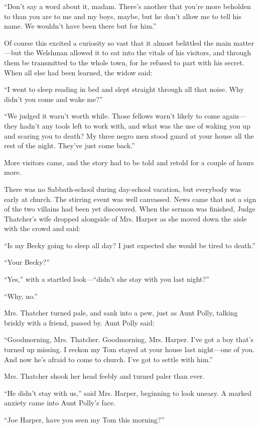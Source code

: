 \documentclass{book}
\begin{document}
“Don’t say a word about it, madam. There’s another that you’re more beholden to than you are to me and my boys, maybe, but he don’t allow me to tell his name. We wouldn’t have been there but for him.”

Of course this excited a curiosity so vast that it almost belittled the main matter—but the Welshman allowed it to eat into the vitals of his visitors, and through them be transmitted to the whole town, for he refused to part with his secret. When all else had been learned, the widow said:

“I went to sleep reading in bed and slept straight through all that noise. Why didn’t you come and wake me?”

“We judged it warn’t worth while. Those fellows warn’t likely to come again—they hadn’t any tools left to work with, and what was the use of waking you up and scaring you to death? My three negro men stood guard at your house all the rest of the night. They’ve just come back.”

More visitors came, and the story had to be told and retold for a couple of hours more.

There was no Sabbath-school during day-school vacation, but everybody was early at church. The stirring event was well canvassed. News came that not a sign of the two villains had been yet discovered. When the sermon was finished, Judge Thatcher’s wife dropped alongside of Mrs. Harper as she moved down the aisle with the crowd and said:

“Is my Becky going to sleep all day? I just expected she would be tired to death.”

“Your Becky?”

“Yes,” with a startled look—“didn’t she stay with you last night?”

“Why, no.”

Mrs. Thatcher turned pale, and sank into a pew, just as Aunt Polly, talking briskly with a friend, passed by. Aunt Polly said:

“Goodmorning, Mrs. Thatcher. Goodmorning, Mrs. Harper. I’ve got a boy that’s turned up missing. I reckon my Tom stayed at your house last night—one of you. And now he’s afraid to come to church. I’ve got to settle with him.”

Mrs. Thatcher shook her head feebly and turned paler than ever.

“He didn’t stay with us,” said Mrs. Harper, beginning to look uneasy. A marked anxiety came into Aunt Polly’s face.

“Joe Harper, have you seen my Tom this morning?”
\end{document}
